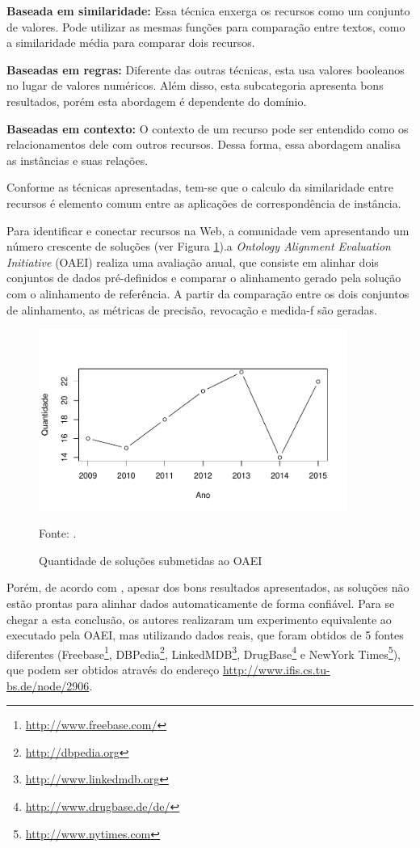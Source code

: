 \textbf{Baseada em similaridade:} Essa técnica enxerga os recursos como um conjunto de valores. Pode utilizar as mesmas funções para comparação entre textos, como a similaridade média para comparar dois recursos. 

\textbf{Baseadas em regras:} Diferente das outras técnicas, esta usa valores booleanos no lugar de valores numéricos. Além disso, esta subcategoria apresenta bons resultados, porém esta abordagem é dependente do domínio. 

\textbf{Baseadas em contexto:} O contexto de um recurso pode ser entendido como os relacionamentos dele com outros recursos. Dessa forma, essa abordagem analisa as instâncias e suas relações.

Conforme as técnicas apresentadas, tem-se que o calculo da similaridade entre recursos é elemento comum entre as aplicações de correspondência de instância.

Para identificar e conectar recursos na Web, a comunidade vem apresentando um número crescente de soluções (ver Figura \ref{fig:oaei_imtools}).a \textit{Ontology Alignment Evaluation Initiative} (OAEI) realiza uma avaliação anual, que consiste em alinhar dois conjuntos de dados pré-definidos e comparar o alinhamento gerado pela solução com o alinhamento de referência. A partir da comparação entre os dois conjuntos de alinhamento, as métricas de precisão, revocação e medida-f são geradas.


\begin{figure}[!h]
        \centering
        \includegraphics[width=0.9\textwidth]{./imagens/im_tools.pdf}
    \caption{Quantidade de soluções submetidas ao OAEI}
        \footnotesize{Fonte: \cite{cheatham2015results}.}
        \label{fig:oaei_imtools}
\end{figure}

Porém, de acordo com , apesar dos bons resultados apresentados, as soluções não estão prontas para alinhar dados automaticamente de forma confiável. Para se chegar a esta conclusão, os autores realizaram um experimento equivalente ao executado pela OAEI, mas utilizando dados reais, que foram obtidos de 5 fontes diferentes (Freebase\footnote{\url{http://www.freebase.com/}}, DBPedia\footnote{\url{http://dbpedia.org}}, LinkedMDB\footnote{\url{http://www.linkedmdb.org}}, DrugBase\footnote{\url{http://www.drugbase.de/de/}} e NewYork Times\footnote{\url{http://www.nytimes.com}}), que podem ser obtidos através do endereço \url{http://www.ifis.cs.tu-bs.de/node/2906}.


